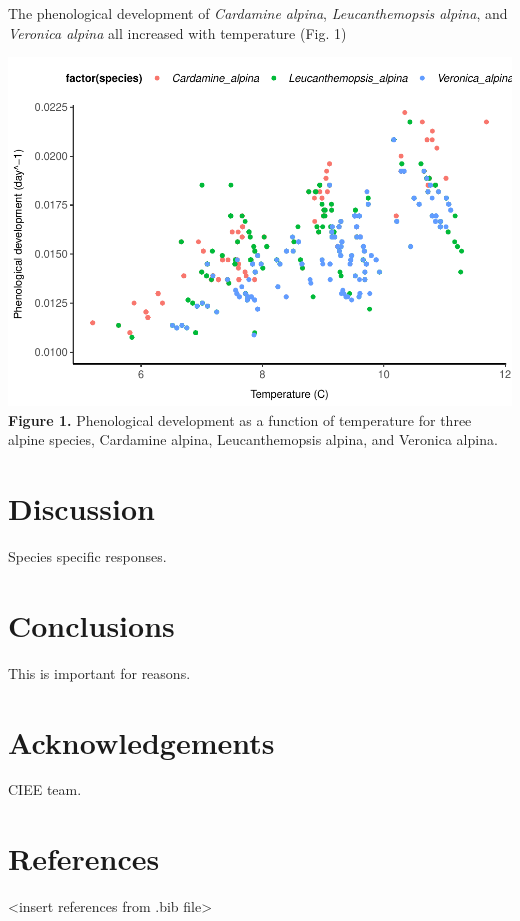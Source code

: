 \documentclass[preprint, 3p,
authoryear]{elsarticle} %
\begin{document}
The phenological development of \emph{Cardamine alpina},
\emph{Leucanthemopsis alpina}, and \emph{Veronica alpina} all increased
with temperature (Fig. 1)

\includegraphics{manuscript_files/figure-latex/unnamed-chunk-1-1.pdf}
\textbf{Figure 1.} Phenological development as a function of temperature
for three alpine species, Cardamine alpina, Leucanthemopsis alpina, and
Veronica alpina.

\hypertarget{discussion}{%
\section{Discussion}\label{discussion}}

Species specific responses.

\hypertarget{conclusions}{%
\section{Conclusions}\label{conclusions}}

This is important for reasons.

\hypertarget{acknowledgements}{%
\section{Acknowledgements}\label{acknowledgements}}

CIEE team.

\hypertarget{references}{%
\section{References}\label{references}}

\textless insert references from .bib file\textgreater{}


\end{document}
